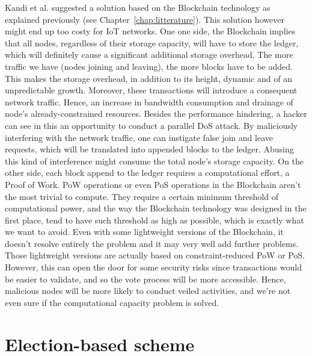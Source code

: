 Kandi et al. \cite{kandi_lightweight_nodate} suggested a solution based on the Blockchain technology as explained previously (see Chapter~\ref{chap:litterature}). This solution however might end up too costy for IoT networks. One one side, the Blockchain implies that all nodes, regardless of their storage capacity, will have to store the ledger, which will definitely cause a significant additional storage overhead. The more traffic we have (nodes joining and leaving), the more blocks have to be added. This makes the storage overhead, in addition to its height, dynamic and of an unpredictable growth. Moreover, these transactions will introduce a consequent network traffic. Hence, an increase in bandwidth consumption and drainage of node’s already-constrained resources. Besides the performance hindering, a hacker can see in this an opportunity to conduct a parallel DoS attack. By maliciously interfering with the network traffic, one can instigate false join and leave requests, which will be translated into appended blocks to the ledger. Abusing this kind of interference might consume the total node’s storage capacity. On the other side, each block append to the ledger requires a computational effort, a Proof of Work. PoW operations or even PoS operations in the Blockchain aren’t the most trivial to compute. They require a certain minimum threshold of computational power, and the way the Blockchain technology was designed in the first place, tend to have such threshold as high as possible, which is exactly what we want to avoid. Even with some lightweight versions of the Blockchain, it doesn’t resolve entirely the problem and it may very well add further problems. Those lightweight versions are actually based on constraint-reduced PoW or PoS. However, this can open the door for some security risks since transactions would be easier to validate, and so the vote process will be more accessible. Hence, malicious nodes will be more likely to conduct veiled activities, and we’re not even sure if the computational capacity problem is solved.

\section{Election-based scheme}
\label{sec:election-based-scheme}

